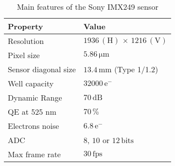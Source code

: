 \begin{table}[!h]
  \centering
  \caption{Main features of the Sony IMX249 sensor}
  \label{tab:IMX249}
  \begin{tabularx}{\linewidth}{XX}
    \toprule
    Property             & Value                                            \\
    \midrule
    Resolution           & $1936\,\mathrm{(H)}\,\times\,1216\,\mathrm{(V)}$ \\
    Pixel size           & $5.86\,\mathrm{\mu m}$                            \\
    Sensor diagonal size & $13.4\,\mathrm{mm}$ (Type 1/1.2)                 \\
    Well capacity        & $32000\,\mathrm{e^{-}}$                          \\
    Dynamic Range        & $70\,\mathrm{dB}$                                \\
    QE at 525 nm         & $70\,\mathrm{\%}$                                \\
    Electrons noise      & $6.8\,\mathrm{e^{-}}$                            \\
    ADC                  & $8$, $10$ or $12\,\mathrm{bits}$                 \\
    Max frame rate        & $30\,\mathrm{fps}$                               \\
    \bottomrule
  \end{tabularx}
\end{table}
